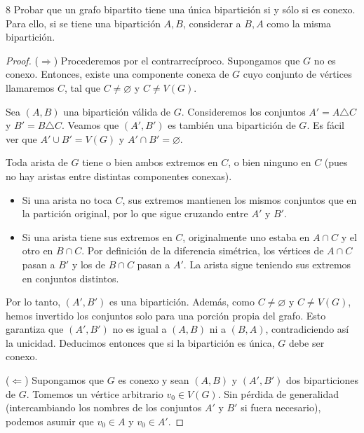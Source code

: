 \begin{ejercicioEntregar}{8}
    Probar que un grafo bipartito tiene una única bipartición si y sólo si es conexo. Para ello, si se tiene una bipartición \( A, B \), considerar a \( B, A \) como la misma bipartición.
\end{ejercicioEntregar}
\begin{proof}
    (\( \Longrightarrow \)) Procederemos por el contrarrecíproco. Supongamos que \(G\) no es conexo. Entonces, existe una componente conexa de \(G\) cuyo conjunto de vértices llamaremos \(C\), tal que \( C \neq \varnothing \) y \(C \neq V(G)\).

    Sea \((A, B)\) una bipartición válida de \(G\). Consideremos los conjuntos \(A' = A \triangle C\) y \(B' = B \triangle C\). Veamos que \((A', B')\) es también una bipartición de \(G\). Es fácil ver que \( A' \cup B' = V(G) \) y \( A' \cap B' = \varnothing \).

    Toda arista de \(G\) tiene o bien ambos extremos en \(C\), o bien ninguno en \(C\) (pues no hay aristas entre distintas componentes conexas).
    \begin{itemize}
        \item Si una arista no toca \(C\), sus extremos mantienen los mismos conjuntos que en la partición original, por lo que sigue cruzando entre \(A'\) y \(B'\).
        \item Si una arista tiene sus extremos en \(C\), originalmente uno estaba en \(A \cap C\) y el otro en \(B \cap C\). Por definición de la diferencia simétrica, los vértices de \(A \cap C\) pasan a \(B'\) y los de \(B \cap C\) pasan a \(A'\). La arista sigue teniendo sus extremos en conjuntos distintos.
    \end{itemize}
    Por lo tanto, \((A', B')\) es una bipartición. Además, como \( C \neq \varnothing \) y \(C \neq V(G)\), hemos invertido los conjuntos solo para una porción propia del grafo. Esto garantiza que \((A', B')\) no es igual a \((A, B)\) ni a \((B, A)\), contradiciendo así la unicidad. Deducimos entonces que si la bipartición es única, \(G\) debe ser conexo.

    \vspace{0.3cm}

    (\( \Longleftarrow \)) Supongamos que \(G\) es conexo y sean \((A, B)\) y \((A', B')\) dos biparticiones de \(G\). Tomemos un vértice arbitrario \(v_0 \in V(G)\). Sin pérdida de generalidad (intercambiando los nombres de los conjuntos \(A'\) y \(B'\) si fuera necesario), podemos asumir que \(v_0 \in A\) y \(v_0 \in A'\).


\end{proof}
